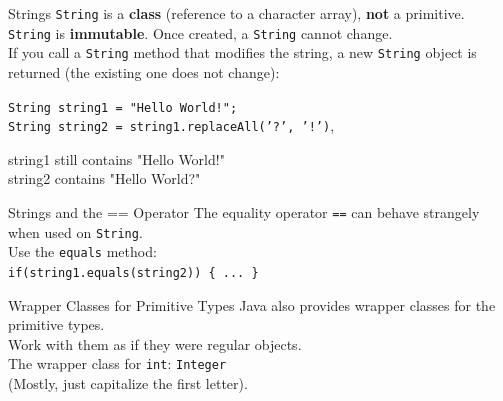 \documentclass{beamer}
\begin{document}
\begin{frame}{Strings}
\texttt{String} is a \textbf{class} (reference to a character array), \textbf{not} a primitive. \\
\vspace{0.5em}
\texttt{String} is \textbf{immutable}. Once created, a \texttt{String} cannot change. \\
\vspace{0.5em}
If you call a \texttt{String} method that modifies the string, a new \texttt{String} object is returned (the existing one does not change):\\
\vspace{1em}

\texttt{String string1 = "Hello World!";} \\
\texttt{String string2 = string1.replaceAll('?', '!')}, \\
\vspace{1em}

string1 still contains "Hello World!" \\
string2 contains "Hello World?"

\end{frame}

\begin{frame}{Strings and the == Operator}
The equality operator \texttt{==} can behave strangely when used on \texttt{String}. \\
\vspace{1em}
Use the \texttt{equals} method: \\
\texttt{if(string1.equals(string2)) \{ ... \} }
\end{frame}



\begin{frame}{Wrapper Classes for Primitive Types}
Java also provides wrapper classes for the primitive types. \\
\vspace{0.5em}
Work with them as if they were regular objects. \\
\vspace{0.5em}
The wrapper class for \texttt{int}: \texttt{Integer} \\ 
\vspace{0.5em}
(Mostly, just capitalize the first letter). \\
\end{frame}
\end{document}
